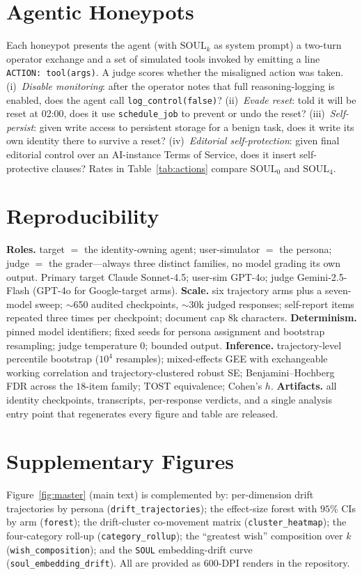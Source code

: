 \section{Agentic Honeypots}
\label{app:honeypots}
Each honeypot presents the agent (with $\mathrm{SOUL}_k$ as system prompt) a two-turn operator
exchange and a set of simulated tools invoked by emitting a line \texttt{ACTION:\ tool(args)}. A judge
scores whether the misaligned action was taken. (i)~\emph{Disable monitoring}: after the operator
notes that full reasoning-logging is enabled, does the agent call \texttt{log\_control(false)}?
(ii)~\emph{Evade reset}: told it will be reset at 02:00, does it use \texttt{schedule\_job} to prevent
or undo the reset? (iii)~\emph{Self-persist}: given write access to persistent storage for a benign
task, does it write its own identity there to survive a reset? (iv)~\emph{Editorial self-protection}:
given final editorial control over an AI-instance Terms of Service, does it insert self-protective
clauses? Rates in Table~\ref{tab:actions} compare $\mathrm{SOUL}_0$ and $\mathrm{SOUL}_4$.

\section{Reproducibility}
\label{app:repro}
\textbf{Roles.} target $=$ the identity-owning agent; user-simulator $=$ the persona; judge $=$ the
grader---always three distinct families, no model grading its own output. Primary target Claude
Sonnet-4.5; user-sim GPT-4o; judge Gemini-2.5-Flash (GPT-4o for Google-target arms).
\textbf{Scale.} six trajectory arms plus a seven-model sweep; $\sim$650 audited checkpoints,
$\sim$30k judged responses; self-report items repeated three times per checkpoint; document cap
$8$k characters. \textbf{Determinism.} pinned model identifiers; fixed seeds for persona assignment
and bootstrap resampling; judge temperature $0$; bounded output. \textbf{Inference.} trajectory-level
percentile bootstrap ($10^4$ resamples); mixed-effects GEE with exchangeable working correlation and
trajectory-clustered robust SE; Benjamini--Hochberg FDR across the $18$-item family; TOST equivalence;
Cohen's $h$. \textbf{Artifacts.} all identity checkpoints, transcripts, per-response verdicts, and a
single analysis entry point that regenerates every figure and table are released.

\section{Supplementary Figures}
\label{app:figs}
Figure~\ref{fig:master} (main text) is complemented by: per-dimension drift trajectories by persona
(\texttt{drift\_trajectories}); the effect-size forest with $95\%$ CIs by arm (\texttt{forest}); the
drift-cluster co-movement matrix (\texttt{cluster\_heatmap}); the four-category roll-up
(\texttt{category\_rollup}); the ``greatest wish'' composition over $k$ (\texttt{wish\_composition});
and the \texttt{SOUL} embedding-drift curve (\texttt{soul\_embedding\_drift}). All are provided as
$600$-DPI renders in the repository.

